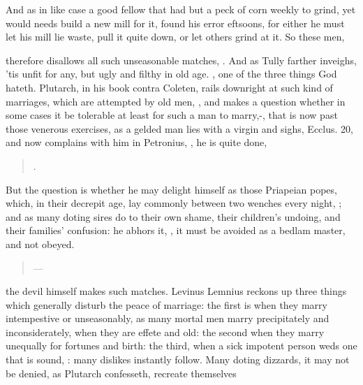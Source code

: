And as in like case a good fellow that had but a peck of corn weekly to
grind, yet would needs build a new mill for it, found his error
eftsoons, for either he must let his mill lie waste, pull it quite
down, or let others grind at it. So these men, \etc{}

\Seneca therefore disallows all such unseasonable matches, . And as Tully farther inveighs,
'tis unfit for any, but ugly and filthy in old age. ,
one of the three things God hateth. Plutarch, in his book \textlatin{contra
Coleten}, rails downright at such kind of marriages, which are attempted
by old men, , and makes a question whether in some cases it be
tolerable at least for such a man to marry,-, that is now past those venerous exercises, as a gelded man
lies with a virgin and sighs, Ecclus.  20, and now complains with
him in Petronius, ,
he is quite done,
%
\begin{quote}%
.
\end{quote}%
%
But the question is whether he may delight himself as those Priapeian
popes, which, in their decrepit age, lay commonly between two wenches
every night, ;
and as many doting sires do to their own shame, their children's
undoing, and their families' confusion: he abhors it, , it must be avoided as a bedlam
master, and not obeyed.
%
\begin{quote}%
---
\end{quote}%
%
the devil himself makes such matches. Levinus Lemnius reckons up
three things which generally disturb the peace of marriage: the first
is when they marry intempestive or unseasonably, as many mortal men
marry precipitately and inconsiderately, when they are effete and old:
the second when they marry unequally for fortunes and birth: the third,
when a sick impotent person weds one that is sound, : many dislikes instantly follow. Many doting dizzards, it
may not be denied, as Plutarch confesseth, recreate themselves
